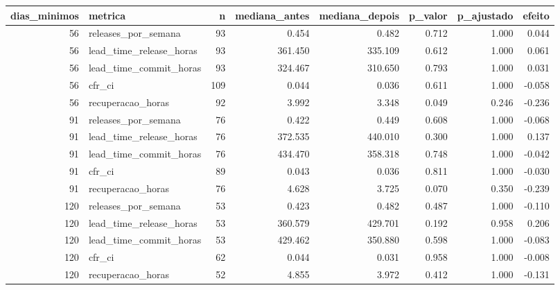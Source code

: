 \begin{tabular}{rlrrrrrr}
\toprule
dias_minimos & metrica & n & mediana_antes & mediana_depois & p_valor & p_ajustado & efeito \\
\midrule
56 & releases_por_semana & 93 & 0.454 & 0.482 & 0.712 & 1.000 & 0.044 \\
56 & lead_time_release_horas & 93 & 361.450 & 335.109 & 0.612 & 1.000 & 0.061 \\
56 & lead_time_commit_horas & 93 & 324.467 & 310.650 & 0.793 & 1.000 & 0.031 \\
56 & cfr_ci & 109 & 0.044 & 0.036 & 0.611 & 1.000 & -0.058 \\
56 & recuperacao_horas & 92 & 3.992 & 3.348 & 0.049 & 0.246 & -0.236 \\
91 & releases_por_semana & 76 & 0.422 & 0.449 & 0.608 & 1.000 & -0.068 \\
91 & lead_time_release_horas & 76 & 372.535 & 440.010 & 0.300 & 1.000 & 0.137 \\
91 & lead_time_commit_horas & 76 & 434.470 & 358.318 & 0.748 & 1.000 & -0.042 \\
91 & cfr_ci & 89 & 0.043 & 0.036 & 0.811 & 1.000 & -0.030 \\
91 & recuperacao_horas & 76 & 4.628 & 3.725 & 0.070 & 0.350 & -0.239 \\
120 & releases_por_semana & 53 & 0.423 & 0.482 & 0.487 & 1.000 & -0.110 \\
120 & lead_time_release_horas & 53 & 360.579 & 429.701 & 0.192 & 0.958 & 0.206 \\
120 & lead_time_commit_horas & 53 & 429.462 & 350.880 & 0.598 & 1.000 & -0.083 \\
120 & cfr_ci & 62 & 0.044 & 0.031 & 0.958 & 1.000 & -0.008 \\
120 & recuperacao_horas & 52 & 4.855 & 3.972 & 0.412 & 1.000 & -0.131 \\
\bottomrule
\end{tabular}
